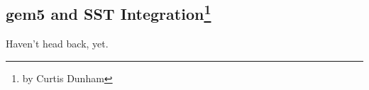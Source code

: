 \subsection[gem5 and SST Integration]{gem5 and SST Integration\footnote{by Curtis Dunham}}

Haven't head back, yet.
